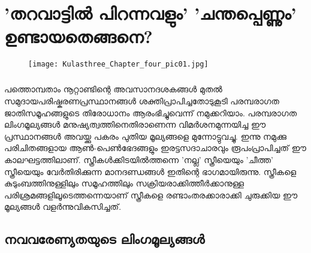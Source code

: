 \chapter{'തറവാട്ടിൽ പിറന്നവളും' 'ചന്തപ്പെണ്ണും' ഉണ്ടായതെങ്ങനെ?}
\label{chapter4}
\begin{figure}[h]
\begin{center}
\texttt{[image: Kulasthree\_Chapter\_four\_pic01.jpg]}
\end{center}
\end{figure}

\paragraph{}പത്തൊമ്പതാം നൂറ്റാണ്ടിന്റെ അവസാനദശകങ്ങൾ മുതൽ സമുദായപരിഷ്കരണപ്രസ്ഥാനങ്ങൾ ശക്തിപ്രാപിച്ചതോടുകൂടി പരമ്പരാഗത ജാതിസമൂഹങ്ങളുടെ തിരോധാനം ആരംഭിച്ചുവെന്ന് നമുക്കറിയാം. പരമ്പരാഗത ലിംഗമൂല്യങ്ങൾ മനുഷ്യത്വത്തിനെതിരാണെന്ന വിമർശനമുന്നയിച്ച ഈ പ്രസ്ഥാനങ്ങൾ അവയ്ക്കു പകരം പുതിയ മൂല്യങ്ങളെ മുന്നോട്ടുവച്ചു. ഇന്നു നമുക്കു പരിചിതങ്ങളായ ആൺ-പെൺഭേദങ്ങളും ഇരട്ടസദാചാരവും രൂപംപ്രാപിച്ചത് ഈ കാലഘട്ടത്തിലാണ്. സ്ത്രീകൾക്കിടയിൽത്തന്നെ 'നല്ല' സ്ത്രീയെയും 'ചീത്ത' സ്ത്രീയെയും വേർതിരിക്കുന്ന മാനദണ്ഡങ്ങൾ ഇതിന്റെ ഭാഗമായിരുന്നു. സ്ത്രീകളെ കുടുംബത്തിനുള്ളിലും സമൂഹത്തിലും സക്രിയരാക്കിത്തീർക്കാനുള്ള പരിശ്രമങ്ങളിലൂടെത്തന്നെയാണ് സ്ത്രീകളെ രണ്ടാംതരക്കാരാക്കി ചുരുക്കിയ ഈ മൂല്യങ്ങൾ വളർന്നുവികസിച്ചത്.

\section{നവവരേണ്യതയുടെ ലിംഗമൂല്യങ്ങൾ}
\label{ch4sec1}
